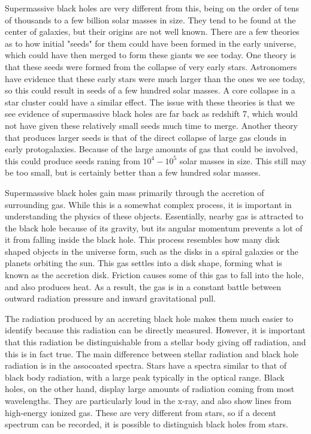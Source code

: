 \documentclass[12pt]{article}
\begin{document}
Supermassive black holes are very different from this, being on the
order of tens of thousands to a few billion solar masses in size.  They tend to
be found at the center of galaxies, but their origins are not well known.  There
are a few theories as to how initial "seeds" for them could have been formed in
the early universe, which could have then merged to form these giants we see
today.  One theory is that these seeds were formed from the collapse of very
early stars.  Astronomers have evidence that these early stars were much larger
than the ones we see today, so this could result in seeds of a few hundred solar
masses.  A core collapse in a star cluster could have a similar effect.  The
issue with these theories is that we see evidence of supermassive black holes
are far back as redshift 7, which would not have given these relatively small
seeds much time to merge.  Another theory that produces larger seeds is that of
the direct collapse of large gas clouds in early protogalaxies.  Because of the
large amounts of gas that could be involved, this could produce seeds raning
from $10^4-10^5$ solar masses in size.  This still may be too small, but is
certainly better than a few hundred solar masses.

Supermassive black holes gain mass primarily through the accretion of
surrounding gas.  While this is a somewhat complex process, it is important in
understanding the physics of these objects.  Essentially, nearby gas is
attracted to the black hole because of its gravity, but its angular momentum
prevents a lot of it from falling inside the black hole.  This process resembles
how many disk shaped objects in the universe form, such as the disks in a spiral
galaxies or the planets orbiting the sun.  This gas settles into a disk shape,
forming what is known as the accretion disk.  Friction causes some of this gas
to fall into the hole, and also produces heat.  As a result, the gas is in a
constant battle between outward radiation pressure and inward gravitational
pull.

The radiation produced by an accreting black hole makes them much easier to
identify because this radiation can be directly measured.  However, it is
important that this radiation be distinguishable from a stellar body giving off
radiation, and this is in fact true.  The main difference between stellar
radiation and black hole radiation is in the assocoated spectra.  Stars have a
spectra similar to that of black body radiation, with a large peak typically in
the optical range.  Black holes, on the other hand, display large amounts of
radiation coming from most wavelengths.  They are particularly loud in the
x-ray, and also show lines from high-energy ionized gas.  These are very
different from stars, so if a decent spectrum can be recorded, it is possible to
distinguish black holes from stars.
\end{document}
